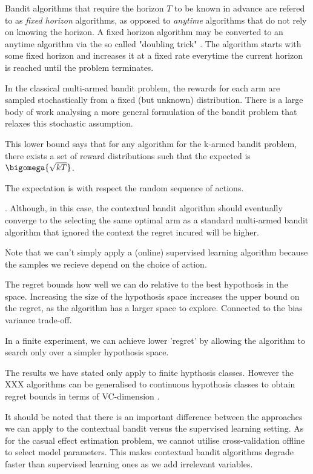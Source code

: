 Bandit algorithms that require the horizon $T$ to be known in advance are refered to as \emph{fixed horizon} algorithms, as opposed to \emph{anytime} algorithms that do not rely on knowing the horizon. A fixed horizon algorithm may be converted to an anytime algorithm via the so called "doubling trick" \citep{}. The algorithm starts with some fixed horizon and increases it at a fixed rate everytime the current horizon is reached until the problem terminates. 

In the classical multi-armed bandit problem, the rewards for each arm are sampled stochastically from a fixed (but unknown) distribution. There is a large body of work analysing a more general formulation of the bandit problem that relaxes this stochastic assumption. 

This lower bound says that for any algorithm for the k-armed bandit problem, there exists a set of reward distributions such that the expected is $\bigomega{\sqrt{kT}}$.

The expectation is with respect the random sequence of actions. 

. Although, in this case, the contextual bandit algorithm should eventually converge to the selecting the same optimal arm as a standard multi-armed bandit algorithm that ignored the context the regret incured will be higher. 


Note that we can't simply apply a (online) supervised learning algorithm because the samples we recieve depend on the choice of action. 

The regret bounds how well we can do relative to the best hypothosis in the space. Increasing the size of the hypothosis space increases the upper bound on the regret, as the algorithm has a larger space to explore. Connected to the bias variance trade-off. 

In a finite experiment, we can achieve lower 'regret' by allowing the algorithm to search only over a simpler hypothosis space. 



The results we have stated only apply to finite hypthosis classes. However the XXX algorithms can be generalised to continuous hypothosis classes to obtain regret bounds in terms of VC-dimension \citep{}.


It should be noted that there is an important difference between the approaches we can apply to the contextual bandit versus the supervised learning setting. As for the casual effect estimation problem, we cannot utilise cross-validation offline to select model parameters. This makes contextual bandit algorithms degrade faster than supervised learning ones as we add irrelevant variables. 

